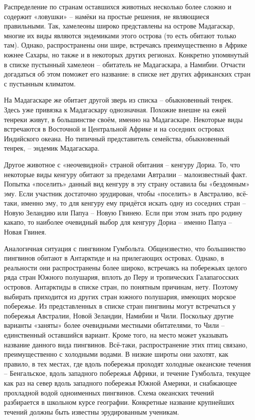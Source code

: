 Распределение по странам оставшихся животных несколько более сложно и содержит «ловушки» – намёки на простые решения, не являющиеся правильными. Так, хамелеоны широко представлены на острове Мадагаскар, многие их виды являются эндемиками этого острова (то есть обитают только там). Однако, распространены они шире, встречаясь преимущественно в Африке южнее Сахары, но также и в некоторых других регионах. Конкретно упомянутый в списке пустынный хамелеон – обитатель не Мадагаскара, а Намибии. Отчасти догадаться об этом поможет его название: в списке нет других африканских стран с пустынным климатом.

На Мадагаскаре же обитает другой зверь из списка – обыкновенный тенрек. Здесь уже привязка к Мадагаскару однозначная. Похожие внешне на ежей тенреки живут, в большинстве своём, именно на Мадагаскаре. Некоторые виды встречаются в Восточной и Центральной Африке и на соседних островах Индийского океана. Но типичный представитель семейства, обыкновенный тенрек, – эндемик Мадагаскара.

Другое животное с «неочевидной» страной обитания – кенгуру Дориа. То, что некоторые виды кенгуру обитают за пределами Автралии – малоизвестный факт. Попытка «поселить» данный вид кенгуру в эту страну оставила бы «бездомным» эму. Если участник достаточно эрудирован, чтобы «поселить» в Австралию, всё-таки, именно эму, то для кенгуру ему придётся искать одну из соседних стран – Новую Зеландию или Папуа – Новую Гвинею. Если при этом знать про родину какапо, то наиболее очевидный выбор для кенгуру Дориа – именно Папуа – Новая Гвинея.

Аналогичная ситуация с пингвином Гумбольта. Общеизвестно, что большинство пингвинов обитают в Антарктиде и на прилегающих островах. Однако, в реальности они распространены более широко, встречаясь на побережьях целого ряда стран Южного полушария, вплоть до Перу и тропических Галапагосских островов. Антарктиды в списке стран, по понятным причинам, нету. Поэтому выбирать приходится из других стран южного полушария, имеющих морское побережье. Из представленных в списке стран пингвины могут встречаться у побережья Австралии, Новой Зеландии, Намибии и Чили. Поскольку другие варианты «заняты» более очевидными местными обитателями, то Чили – единственный оставшийся вариант. Кроме того, на место может указывать название данного вида пингвинов. Всё-таки, распространение этих птиц связано, преимущественно с холодными водами. В низкие широты они захотят, как правило, в тех местах, где вдоль побережья проходят холодные океанские течения – Бенгальское, вдоль западного побережья Африки, и течение Гумбольта, текущее как раз на север вдоль западного побережья Южной Америки, и снабжающее прохладной водой одноименных пингвинов. Схема океанских течений разбирается в школьном курсе географии. Конкретные название крупнейших течений должны быть известны эрудированным ученикам.

